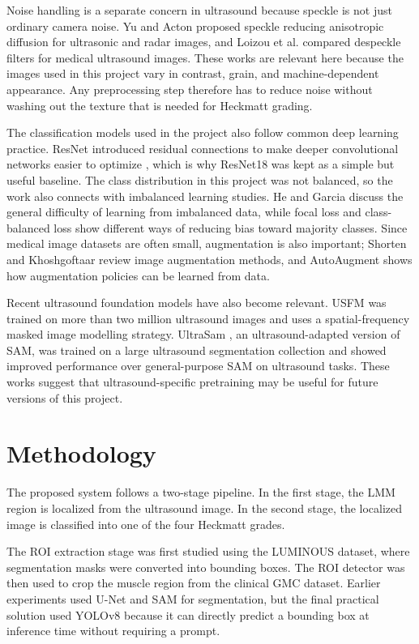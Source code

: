 ﻿\documentclass[12pt,a4paper]{report}
\begin{document}
Noise handling is a separate concern in ultrasound because speckle is not just ordinary camera noise. Yu and Acton \cite{YuActon2002} proposed speckle reducing anisotropic diffusion for ultrasonic and radar images, and Loizou et al. \cite{Loizou2005} compared despeckle filters for medical ultrasound images. These works are relevant here because the images used in this project vary in contrast, grain, and machine-dependent appearance. Any preprocessing step therefore has to reduce noise without washing out the texture that is needed for Heckmatt grading.

The classification models used in the project also follow common deep learning practice. ResNet introduced residual connections to make deeper convolutional networks easier to optimize \cite{he2016resnet}, which is why ResNet18 was kept as a simple but useful baseline. The class distribution in this project was not balanced, so the work also connects with imbalanced learning studies. He and Garcia \cite{HeGarcia2009} discuss the general difficulty of learning from imbalanced data, while focal loss \cite{LinFocal2017} and class-balanced loss \cite{Cui2019} show different ways of reducing bias toward majority classes. Since medical image datasets are often small, augmentation is also important; Shorten and Khoshgoftaar \cite{Shorten2019} review image augmentation methods, and AutoAugment \cite{Cubuk2019} shows how augmentation policies can be learned from data.

Recent ultrasound foundation models have also become relevant. USFM \cite{JIAO2024103202} was trained on more than two million ultrasound images and uses a spatial-frequency masked image modelling strategy. UltraSam \cite{meyer2024ultrasam}, an ultrasound-adapted version of SAM, was trained on a large ultrasound segmentation collection and showed improved performance over general-purpose SAM on ultrasound tasks. These works suggest that ultrasound-specific pretraining may be useful for future versions of this project.


\chapter{Methodology}
\label{chap:methodology}
\label{methodology}
The proposed system follows a two-stage pipeline. In the first stage, the LMM region is localized from the ultrasound image. In the second stage, the localized image is classified into one of the four Heckmatt grades.

The ROI extraction stage was first studied using the LUMINOUS dataset, where segmentation masks were converted into bounding boxes. The ROI detector was then used to crop the muscle region from the clinical GMC dataset. Earlier experiments used U-Net and SAM for segmentation, but the final practical solution used YOLOv8 because it can directly predict a bounding box at inference time without requiring a prompt.
\end{document}
